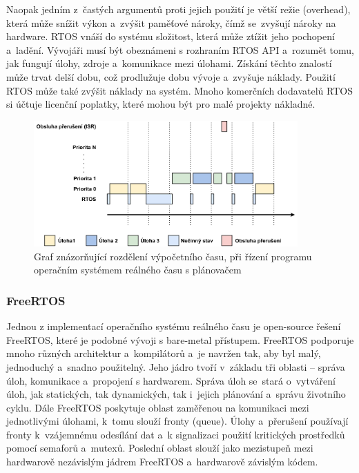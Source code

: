 Naopak jedním z~častých argumentů proti jejich použití je větší režie (overhead), která může snížit výkon a~zvýšit paměťové nároky, čímž se~zvyšují nároky na hardware. RTOS vnáší do systému složitost, která může ztížit jeho pochopení a~ladění. Vývojáři musí být obeznámeni s rozhraním RTOS API a~rozumět tomu, jak fungují úlohy, zdroje a~komunikace mezi úlohami. Získání těchto znalostí může trvat delší dobu, což prodlužuje dobu vývoje a~zvyšuje náklady. Použití RTOS může také zvýšit náklady na systém. Mnoho komerčních dodavatelů RTOS si účtuje licenční poplatky, které mohou být pro malé projekty nákladné.~\cite{sysgo_baremetal_vs_rtos}

\begin{figure}[h]
    \centering
    \includegraphics[width=0.90\textwidth]{obrazky-figures/rtos_scheduling.pdf}
    
    \caption{Graf znázorňující rozdělení výpočetního času, při řízení programu operačním systémem reálného času s plánovačem~\cite{freertos_book}}
    \label{fig:rtos-scheduling}
\end{figure}


\subsubsection{FreeRTOS}
Jednou z implementací operačního systému reálného času je open-source řešení FreeRTOS, které je podobné vývoji s bare-metal přístupem. FreeRTOS podporuje mnoho různých architektur a~kompilátorů a~je navržen tak, aby byl malý, jednoduchý a~snadno použitelný. Jeho jádro tvoří v~základu tři oblasti -- správa úloh, komunikace a~propojení s hardwarem. Správa úloh se~stará o~vytváření úloh, jak statických, tak dynamických, tak i~jejich plánování a~správu životního cyklu. Dále FreeRTOS poskytuje oblast zaměřenou na komunikaci mezi jednotlivými úlohami, k~tomu slouží fronty (queue). Úlohy a~přerušení používají fronty k~vzájemnému odesílání dat a~k signalizaci použití kritických prostředků pomocí semaforů a~mutexů. Poslední oblast slouží jako mezistupeň mezi hardwarově nezávislým jádrem FreeRTOS a~hardwarově závislým kódem.~\cite{the_architecture_of_open_source_applications}

